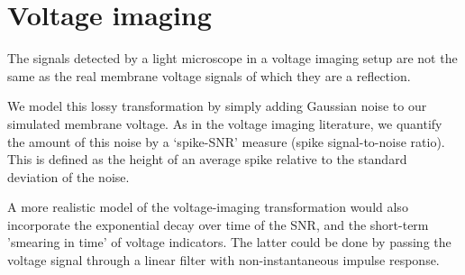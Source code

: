 \section{Voltage imaging}

The signals detected by a light microscope in a voltage imaging setup are not the same as the real membrane voltage signals of which they are a reflection.

We model this lossy transformation by simply adding Gaussian noise to our simulated membrane voltage. As in the voltage imaging literature, we quantify the amount of this  noise by a `spike-SNR' measure (spike signal-to-noise ratio). This is defined as the height of an average spike relative to the standard deviation of the noise.

A more realistic model of the voltage-imaging transformation would also incorporate the exponential decay over time of the SNR, and the short-term 'smearing in time' of voltage indicators. The latter could be done by passing the voltage signal through a linear filter with non-instantaneous impulse response.
